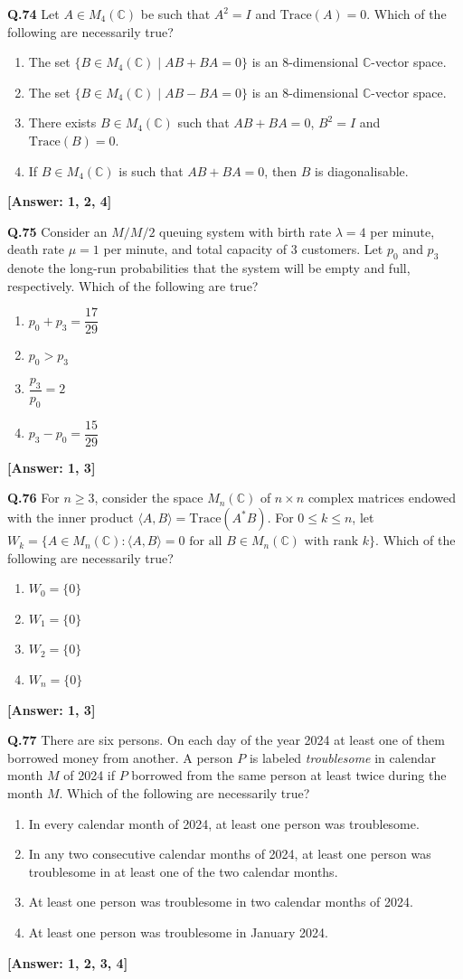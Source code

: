 \documentclass[12pt,a4paper]{article}
\newcommand{\ans}[1]{\quad\textcolor{anscolor}{\textbf{[Answer: #1]}}}
\begin{document}
\textbf{Q.74} Let $A\in M_4(\mathbb{C})$ be such that $A^2=I$ and $\text{Trace}(A)=0$. Which of the following are necessarily true?
\begin{enumerate}[label=\arabic*.]
\item The set $\{B\in M_4(\mathbb{C})\mid AB+BA=0\}$ is an 8-dimensional $\mathbb{C}$-vector space.
\item The set $\{B\in M_4(\mathbb{C})\mid AB-BA=0\}$ is an 8-dimensional $\mathbb{C}$-vector space.
\item There exists $B\in M_4(\mathbb{C})$ such that $AB+BA=0$, $B^2=I$ and $\text{Trace}(B)=0$.
\item If $B\in M_4(\mathbb{C})$ is such that $AB+BA=0$, then $B$ is diagonalisable.
\end{enumerate}\ans{1, 2, 4}

\textbf{Q.75} Consider an $M/M/2$ queuing system with birth rate $\lambda=4$ per minute, death rate $\mu=1$ per minute, and total capacity of 3 customers. Let $p_0$ and $p_3$ denote the long-run probabilities that the system will be empty and full, respectively. Which of the following are true?
\begin{enumerate}[label=\arabic*.]
\item $p_0+p_3=\dfrac{17}{29}$ \item $p_0>p_3$ \item $\dfrac{p_3}{p_0}=2$ \item $p_3-p_0=\dfrac{15}{29}$
\end{enumerate}\ans{1, 3}

\textbf{Q.76} For $n\ge3$, consider the space $M_n(\mathbb{C})$ of $n\times n$ complex matrices endowed with the inner product $\langle A,B\rangle=\text{Trace}(A^*B)$. For $0\le k\le n$, let $W_k=\{A\in M_n(\mathbb{C}):\langle A,B\rangle=0\text{ for all }B\in M_n(\mathbb{C})\text{ with rank }k\}$. Which of the following are necessarily true?
\begin{enumerate}[label=\arabic*.]
\item $W_0=\{0\}$ \item $W_1=\{0\}$ \item $W_2=\{0\}$ \item $W_n=\{0\}$
\end{enumerate}\ans{1, 3}

\textbf{Q.77} There are six persons. On each day of the year 2024 at least one of them borrowed money from another. A person $P$ is labeled \textit{troublesome} in calendar month $M$ of 2024 if $P$ borrowed from the same person at least twice during the month $M$. Which of the following are necessarily true?
\begin{enumerate}[label=\arabic*.]
\item In every calendar month of 2024, at least one person was troublesome.
\item In any two consecutive calendar months of 2024, at least one person was troublesome in at least one of the two calendar months.
\item At least one person was troublesome in two calendar months of 2024.
\item At least one person was troublesome in January 2024.
\end{enumerate}\ans{1, 2, 3, 4}
\end{document}
